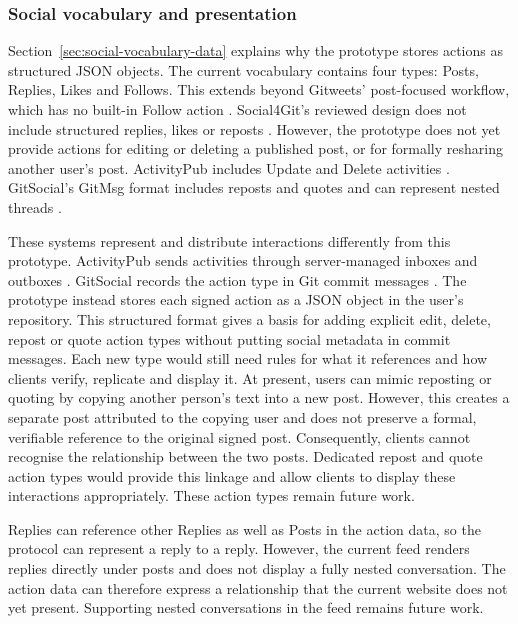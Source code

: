 \subsubsection{Social vocabulary and presentation}\label{sec:limitation-social-vocabulary}

Section~\ref{sec:social-vocabulary-data} explains why the prototype stores
actions as structured JSON objects. The
current vocabulary contains four types: Posts, Replies, Likes and Follows.
This extends beyond Gitweets' post-focused workflow, which has no built-in
Follow action \cite{gitweets2026}. Social4Git's reviewed design does not include
structured replies, likes or reposts \cite{social4git2026}.
However, the prototype does not yet provide actions for editing or deleting
a published post, or for formally
resharing another user's post. ActivityPub includes Update and Delete
activities \cite{w3cActivityPub2018}. GitSocial's GitMsg format includes
reposts and quotes and can represent nested threads \cite{gitsocial2026}.

These systems represent and distribute interactions differently from this
prototype. ActivityPub sends activities through server-managed inboxes and
outboxes \cite{w3cActivityPub2018}. GitSocial records the action type in Git
commit messages \cite{gitsocial2026}. The prototype instead stores each
signed action as a JSON object in the user's repository. This structured
format gives a basis for adding explicit edit, delete, repost or quote
action types without putting social metadata in commit messages. Each new
type would still need rules for what it
references and how clients verify, replicate and display it. At present, users can mimic 
reposting or quoting by copying another person's text into a new post. 
However, this creates a separate post attributed to the copying user and does not preserve a formal, 
verifiable reference to the original signed post. Consequently, clients cannot recognise the relationship 
between the two posts. Dedicated repost and quote action types would provide this linkage and allow 
clients to display these interactions appropriately. These action types remain future work.

Replies can reference other Replies as well as Posts in the action data, so
the protocol can represent a reply to a reply. However, the current feed
renders replies directly under posts and does not display a fully nested
conversation. The action data can therefore express a relationship that the
current website does not yet present. Supporting nested conversations in
the feed remains future work.

